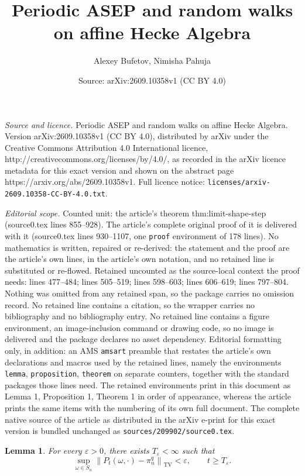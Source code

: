 \documentclass[10pt,a4paper]{amsart}
\title{Periodic ASEP and random walks on affine Hecke Algebra}
\author{Alexey Bufetov, Nimisha Pahuja}
\date{Source: arXiv:2609.10358v1 (CC BY 4.0)}
\newtheorem{lemma}{Lemma}
\newcommand{\TV}{\mathrm{TV}}
\newcommand{\norm}[1]{\left\lVert #1\right\rVert}
\begin{document}
\maketitle

\noindent\emph{Source and licence.} Periodic ASEP and random walks on affine Hecke Algebra. Version arXiv:2609.10358v1 (CC BY 4.0), distributed by arXiv under the Creative Commons Attribution 4.0 International licence, http://creativecommons.org/licenses/by/4.0/, as recorded in the arXiv licence metadata for this exact version and shown on the abstract page https://arxiv.org/abs/2609.10358v1. Full licence notice: \texttt{licenses/arxiv-2609.10358-CC-BY-4.0.txt}.\par\smallskip

\noindent\textit{Editorial scope.} Counted unit: the article's theorem thm:limit-shape-step (source0.tex lines 855--928). The article's complete original proof of it is delivered with it (source0.tex lines 930--1107, one \texttt{proof} environment of 178 lines). No mathematics is written, repaired or re-derived: the statement and the proof are the article's own lines, in the article's own notation, and no retained line is substituted or re-flowed.  Retained uncounted as the source-local context the proof needs: lines 477--484; lines 505--519; lines 598--603; lines 606--619; lines 797--804.  Nothing was omitted from any retained span, so the package carries no omission record.  No retained line contains a citation, so the wrapper carries no bibliography and no bibliography entry.  No retained line contains a figure environment, an image-inclusion command or drawing code, so no image is delivered and the package declares no asset dependency.  Editorial formatting only, in addition: an AMS \texttt{amsart} preamble that restates the article's own declarations and macros used by the retained lines, namely the environments \texttt{lemma}, \texttt{proposition}, \texttt{theorem} on separate counters, together with the standard packages those lines need.  The retained environments print in this document as Lemma 1, Proposition 1, Theorem 1 in order of appearance, whereas the article prints the same items with the numbering of its own full document.  The complete native source of the article as distributed in the arXiv e-print for this exact version is bundled unchanged as \texttt{sources/209902/source0.tex}.
	\begin{lemma}\label{lem:ring-mixing}
		For every $\varepsilon>0$, there exists $T_\varepsilon<\infty$ such that
		\begin{equation}\label{eq:ring-mixing}
			\sup_{\omega\in S_n}
			\norm{P_t(\omega,\cdot)-\pi_n^q}_{\TV}<\varepsilon,
			\qquad t\ge T_\varepsilon.
		\end{equation}
	\end{lemma}
\end{document}
